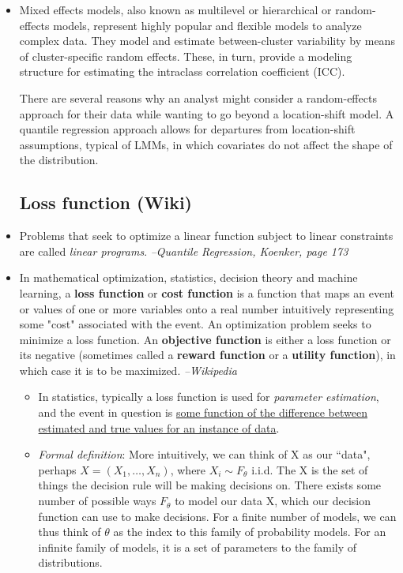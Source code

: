 \documentclass{article}
\begin{document}
\begin{itemize}
\item \cite{geraci2013linear} Mixed effects models, also known as multilevel or hierarchical or random-effects models, represent highly popular and flexible models to analyze complex data. They model and estimate between-cluster variability by means of cluster-specific random effects. These, in turn, provide a modeling structure for estimating the intraclass correlation coefficient (ICC).\par

There are several reasons why an analyst might consider a random-effects approach for their data while wanting to go beyond a location-shift model. A quantile regression approach allows for departures from location-shift assumptions, typical of LMMs, in which covariates do not affect the shape of the distribution.\par







\subsection*{Loss function (Wiki)}
\item Problems that seek to optimize a linear function subject to linear constraints are called {\em linear programs}. \hfill{\em --Quantile Regression, Koenker, page 173}


\item In mathematical optimization, statistics, decision theory and machine learning, a {\bf loss function} or {\bf cost function} is a function that maps an event or values of one or more variables onto a real number intuitively representing some "cost" associated with the event. An optimization problem seeks to minimize a loss function. An {\bf objective function} is either a loss function or its negative (sometimes called a {\bf reward function} or a {\bf utility function}), in which case it is to be maximized. \hfill{\em --Wikipedia}
\begin{itemize}
\item In statistics, typically a loss function is used for {\em parameter estimation}, and the event in question is \underline{some function of the difference between estimated and true values for an instance of data}.
\item {\em Formal definition}: More intuitively, we can think of X as our ``data", perhaps $X=(X_1,\ldots,X_n)$, where $X_i\sim F_\theta$ i.i.d. The X is the set of things the decision rule will be making decisions on. There exists some number of possible ways $F_\theta$ to model our data X, which our decision function can use to make decisions. For a finite number of models, we can thus think of $\theta$ as the index to this family of probability models. For an infinite family of models, it is a set of parameters to the family of distributions.


\end{itemize}
\end{itemize}
\end{document}
